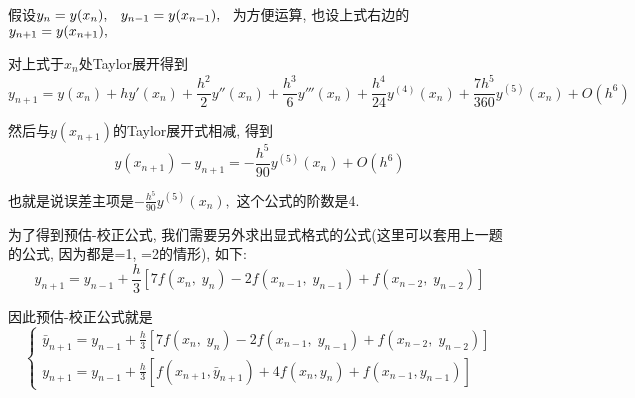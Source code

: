 \documentclass{article}
\newcommand{\tmtextit}[1]{\text{{\itshape{#1}}}}
\begin{document}
假设$y_n = y (x_n), \hspace{0.8em} y_{n - 1} = y (x_{n - 1}),
\hspace{0.8em}$为方便运算, 也设上式右边的$y_{n + 1} = y (x_{n +
1}), \hspace{0.8em}$

对上式于$x_n 处$Taylor展开得到
\[ y_{n + 1} = y (x_n) + h y' (x_n) + \frac{h^2}{2} y'' (x_n) + \frac{h^3}{6}
   y''' (x_n) + \frac{h^4}{24} y^{(4)} (x_n) + \frac{7 h^5}{360} y^{(5)} (x_n)
   + O (h^6) \]


然后与$y (x_{n + 1})$的Taylor展开式相减, 得到
\[ y (x_{n + 1}) - y_{n + 1} = - \frac{h^5}{90} y^{(5)} (x_n) + O (h^6) \]


也就是说误差主项是$- \frac{h^5}{90} y^{(5)} (x_n),$
这个公式的阶数是4.

为了得到预估-校正公式,
我们需要另外求出显式格式的公式(这里可以套用上一题的公式,
因为都是\tmtextit{p}=1, \tmtextit{q}=2的情形), 如下:
\[ \  \]
\[ y_{n + 1} = y_{n - 1} + \frac{h}{3} \left[ 7 f \left( x_n, \; y_n \right) -
   2 f \left( x_{n - 1}, \; y_{n - 1} \right) + f \left( x_{n - 2}, \; y_{n -
   2} \right) \right] \]


因此预估-校正公式就是
\[ \left\{ \begin{array}{c}
     \bar{y}_{n + 1} = y_{n - 1} + \frac{h}{3} \left[ 7 f \left( x_n, \; y_n
     \right) - 2 f \left( x_{n - 1}, \; y_{n - 1} \right) + f \left( x_{n -
     2}, \; y_{n - 2} \right) \right]\\
     y_{n + 1} = y_{n - 1} + \frac{h}{3} [f (x_{n + 1}, \bar{y}_{n + 1}) + 4 f
     (x_n, y_n) + f (x_{n - 1}, y_{n - 1})]
   \end{array} \right. \]
\end{document}
